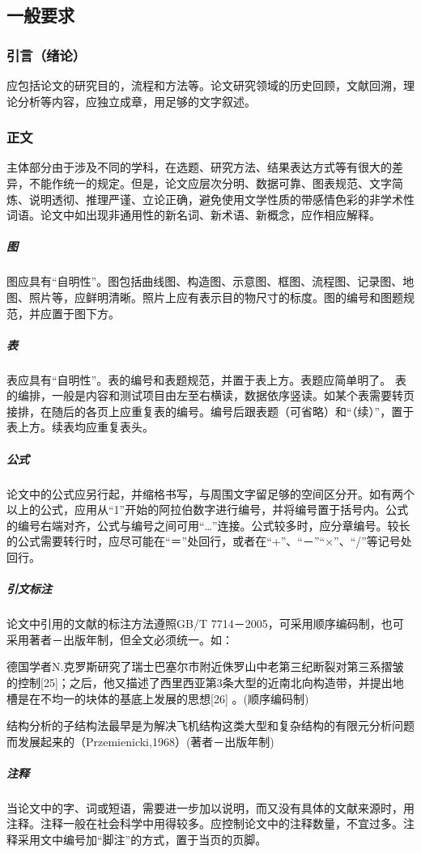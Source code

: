 \subsection{一般要求} %
\label{sub:一般要求}
\subsubsection{引言（绪论）} %
\label{ssub:引言_绪论_}
应包括论文的研究目的，流程和方法等。论文研究领域的历史回顾，文献回溯，理论分析等内容，应独立成章，用足够的文字叙述。
\subsubsection{正文} %
\label{ssub:正文}
主体部分由于涉及不同的学科，在选题、研究方法、结果表达方式等有很大的差异，不能作统一的规定。但是，论文应层次分明、数据可靠、图表规范、文字简炼、说明透彻、推理严谨、立论正确，避免使用文学性质的带感情色彩的非学术性词语。论文中如出现非通用性的新名词、新术语、新概念，应作相应解释。
\subparagraph{图} %
\label{subp:图}
图应具有“自明性”。图包括曲线图、构造图、示意图、框图、流程图、记录图、地图、照片等，应鲜明清晰。照片上应有表示目的物尺寸的标度。图的编号和图题规范，并应置于图下方。
\subparagraph{表} %
\label{subp:表}
表应具有“自明性”。表的编号和表题规范，并置于表上方。表题应简单明了。
表的编排，一般是内容和测试项目由左至右横读，数据依序竖读。如某个表需要转页接排，在随后的各页上应重复表的编号。编号后跟表题（可省略）和“（续）”，置于表上方。续表均应重复表头。
\subparagraph{公式} %
\label{subp:公式}
论文中的公式应另行起，并缩格书写，与周围文字留足够的空间区分开。如有两个以上的公式，应用从“1”开始的阿拉伯数字进行编号，并将编号置于括号内。公式的编号右端对齐，公式与编号之间可用“…”连接。公式较多时，应分章编号。较长的公式需要转行时，应尽可能在“＝”处回行，或者在“+”、“－”“×”、“/”等记号处回行。
\subparagraph{引文标注} %
\label{subp:引文标注}
论文中引用的文献的标注方法遵照GB/T 7714－2005，可采用顺序编码制，也可采用著者－出版年制，但全文必须统一。如：

德国学者N.克罗斯研究了瑞士巴塞尔市附近侏罗山中老第三纪断裂对第三系摺皱的控制[25]；之后，他又描述了西里西亚第3条大型的近南北向构造带，并提出地槽是在不均一的块体的基底上发展的思想[26] 。(顺序编码制)

结构分析的子结构法最早是为解决飞机结构这类大型和复杂结构的有限元分析问题而发展起来的（Przemienicki,1968）(著者－出版年制)
\subparagraph{注释} %
\label{subp:注释}
当论文中的字、词或短语，需要进一步加以说明，而又没有具体的文献来源时，用注释。注释一般在社会科学中用得较多。应控制论文中的注释数量，不宜过多。注释采用文中编号加“脚注”的方式，置于当页的页脚。
